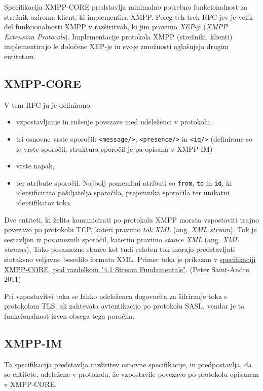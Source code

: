\documentclass[11pt]{article}
\begin{document}
Specifikacija XMPP-CORE predstavlja minimalno potrebno funkcionalnost
za strežnik oziroma klient, ki implementira XMPP. Poleg teh treh
RFC-jev je velik del funkcionalnosti XMPP v razširitvah, ki jim
pravimo \emph{XEP}-ji (\emph{XMPP Extension Protocols}). Implementacije
protokola XMPP (strežniki, klienti) implementirajo le določene XEP-je
in svoje zmožnosti oglašujejo drugim entitetam.

\subsection{XMPP-CORE}
\label{sec:org8e89edd}

V tem RFC-ju je definirano:

\begin{itemize}
\item vzpostavljanje in rušenje povezave med udeleženci v protokolu,
\item tri osnovne vrste sporočil: \texttt{<message/>}, \texttt{<presence/>} in \texttt{<iq/>}
(definirane so le vrste sporočil, struktura sporočil je pa opisana v
XMPP-IM)
\item vrste napak,
\item ter atribute sporočil. Najbolj pomembni atributi so \texttt{from}, \texttt{to} in
\texttt{id}, ki identificirata pošiljatelja sporočila, prejemnika sporočila
ter unikatni identifikator toka.
\end{itemize}

Dve entiteti, ki želita komunicirati po protokolu XMPP morata
vzpostaviti trajno povezavo po protokolu TCP, kateri pravimo \emph{tok XML}
(ang. \emph{XML stream}). Tok je sestavljen iz posameznih sporočil, katerim
pravimo \emph{stance XML} (ang. \emph{XML stanzas}). Tako posamezne stance kot
tudi celoten tok morajo predstavljati sintaksno veljavno besedilo
formata XML. Primer toka je prikazan v \href{https://xmpp.org/rfcs/rfc6120.html\#streams-fundamentals}{specifikaciji XMPP-CORE, pod
razdelkom "4.1 Stream Fundamentals"}. (Peter Saint-Andre, 2011)

Pri vzpostavitvi toka se lahko udeleženca dogovorita za šifriranje
toka s protokolom TLS, ali zahtevata avtentikacijo po protokolu SASL,
vendar je ta funkcionalnost izven obsega tega poročila.

\subsection{XMPP-IM}
\label{sec:org0f7302d}

Ta specifikacija predstavlja razširitev osnovne specifikacije, in
predpostavlja, da so entitete, udeležene v protokolu, že vzpostavile
povezavo po protokolu opisanem v XMPP-CORE.
\end{document}
